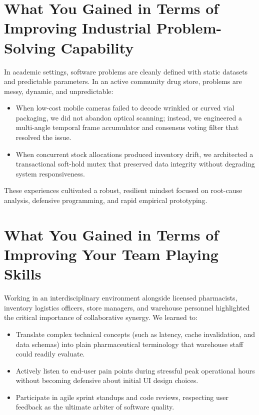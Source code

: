 \section{What You Gained in Terms of Improving Industrial Problem-Solving Capability}
In academic settings, software problems are cleanly defined with static datasets and predictable parameters. In an active community drug store, problems are messy, dynamic, and unpredictable:
\begin{itemize}
    \item When low-cost mobile cameras failed to decode wrinkled or curved vial packaging, we did not abandon optical scanning; instead, we engineered a multi-angle temporal frame accumulator and consensus voting filter that resolved the issue.
    \item When concurrent stock allocations produced inventory drift, we architected a transactional soft-hold mutex that preserved data integrity without degrading system responsiveness.
\end{itemize}
These experiences cultivated a robust, resilient mindset focused on root-cause analysis, defensive programming, and rapid empirical prototyping.

\section{What You Gained in Terms of Improving Your Team Playing Skills}
Working in an interdisciplinary environment alongside licensed pharmacists, inventory logistics officers, store managers, and warehouse personnel highlighted the critical importance of collaborative synergy. We learned to:
\begin{itemize}
    \item Translate complex technical concepts (such as latency, cache invalidation, and data schemas) into plain pharmaceutical terminology that warehouse staff could readily evaluate.
    \item Actively listen to end-user pain points during stressful peak operational hours without becoming defensive about initial UI design choices.
    \item Participate in agile sprint standups and code reviews, respecting user feedback as the ultimate arbiter of software quality.
\end{itemize}

